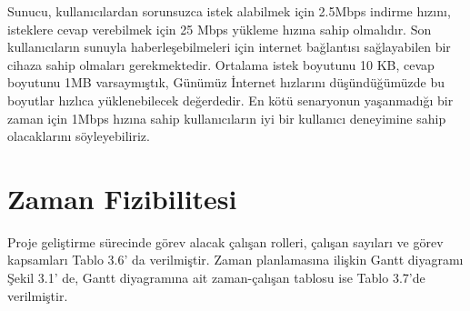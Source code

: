 Sunucu, kullanıcılardan sorunsuzca istek alabilmek için 2.5Mbps indirme hızını,
isteklere cevap verebilmek için 25 Mbps yükleme hızına sahip olmalıdır.
Son kullanıcıların sunuyla haberleşebilmeleri için internet bağlantısı sağlayabilen bir
cihaza sahip olmaları gerekmektedir. Ortalama istek boyutunu 10 KB, cevap boyutunu 1MB varsaymıştık, Günümüz 
İnternet hızlarını düşündüğümüzde bu boyutlar hızlıca yüklenebilecek değerdedir. En kötü senaryonun yaşanmadığı bir zaman için
1Mbps hızına sahip kullanıcıların iyi bir kullanıcı deneyimine sahip olacaklarını söyleyebiliriz.

\section{Zaman Fizibilitesi}
Proje geliştirme sürecinde görev alacak çalışan rolleri, çalışan sayıları ve görev
kapsamları Tablo 3.6’ da verilmiştir. Zaman planlamasına ilişkin Gantt diyagramı Şekil
3.1’ de, Gantt diyagramına ait zaman-çalışan tablosu ise Tablo 3.7’de verilmiştir.

